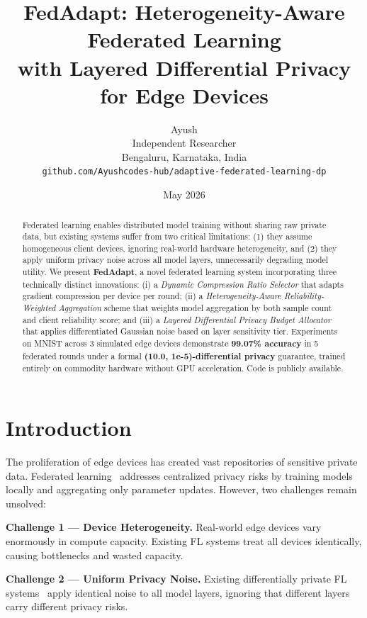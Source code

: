 \documentclass[10pt,twocolumn]{article}
\title{\textbf{FedAdapt: Heterogeneity-Aware Federated Learning\\
with Layered Differential Privacy for Edge Devices}}
\author{
Ayush\\
Independent Researcher\\
Bengaluru, Karnataka, India\\
\texttt{github.com/Ayushcodes-hub/adaptive-federated-learning-dp}
}
\date{May 2026}
\begin{document}
\maketitle

\begin{abstract}
Federated learning enables distributed model training without sharing
raw private data, but existing systems suffer from two critical
limitations: (1) they assume homogeneous client devices, ignoring
real-world hardware heterogeneity, and (2) they apply uniform privacy
noise across all model layers, unnecessarily degrading model utility.
We present \textbf{FedAdapt}, a novel federated learning system
incorporating three technically distinct innovations: (i) a
\textit{Dynamic Compression Ratio Selector} that adapts gradient
compression per device per round; (ii) a
\textit{Heterogeneity-Aware Reliability-Weighted Aggregation} scheme
that weights model aggregation by both sample count and client
reliability score; and (iii) a \textit{Layered Differential Privacy
Budget Allocator} that applies differentiated Gaussian noise based
on layer sensitivity tier. Experiments on MNIST across 3 simulated
edge devices demonstrate \textbf{99.07\% accuracy} in 5 federated
rounds under a formal \textbf{(10.0, 1e-5)-differential privacy}
guarantee, trained entirely on commodity hardware without GPU
acceleration. Code is publicly available.
\end{abstract}

\section{Introduction}

The proliferation of edge devices has created vast repositories of
sensitive private data. Federated learning~\cite{mcmahan2017} addresses
centralized privacy risks by training models locally and aggregating
only parameter updates. However, two challenges remain unsolved:

\textbf{Challenge 1 --- Device Heterogeneity.} Real-world edge devices
vary enormously in compute capacity. Existing FL systems treat all
devices identically, causing bottlenecks and wasted capacity.

\textbf{Challenge 2 --- Uniform Privacy Noise.} Existing differentially
private FL systems~\cite{geyer2017,mcmahan2018} apply identical noise
to all model layers, ignoring that different layers carry different
privacy risks.
\end{document}
